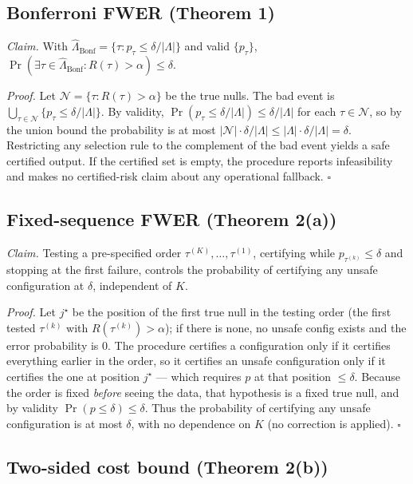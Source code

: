 \documentclass{ieeeaccess}
\begin{document}
\subsection{Bonferroni FWER (Theorem 1)}

\emph{Claim.} With $\hat\Lambda_{\mathrm{Bonf}}=\{\tau:p_\tau\le\delta/|\Lambda|\}$ and valid $\{p_\tau\}$, $\Pr(\exists\tau\in\hat\Lambda_{\mathrm{Bonf}}:R(\tau)>\alpha)\le\delta$.

\emph{Proof.} Let $\mathcal N=\{\tau:R(\tau)>\alpha\}$ be the true nulls. The bad event is $\bigcup_{\tau\in\mathcal N}\{p_\tau\le\delta/|\Lambda|\}$. By validity, $\Pr(p_\tau\le\delta/|\Lambda|)\le\delta/|\Lambda|$ for each $\tau\in\mathcal N$, so by the union bound the probability is at most $|\mathcal N|\cdot\delta/|\Lambda|\le|\Lambda|\cdot\delta/|\Lambda|=\delta$. Restricting any selection rule to the complement of the bad event yields a safe certified output. If the certified set is empty, the procedure reports infeasibility and makes no certified-risk claim about any operational fallback. $\square$

\subsection{Fixed-sequence FWER (Theorem 2(a))}

\emph{Claim.} Testing a pre-specified order $\tau^{(K)},\dots,\tau^{(1)}$, certifying while $p_{\tau^{(k)}}\le\delta$ and stopping at the first failure, controls the probability of certifying any unsafe configuration at $\delta$, independent of $K$.

\emph{Proof.} Let $j^\star$ be the position of the first true null in the testing order (the first tested $\tau^{(k)}$ with $R(\tau^{(k)})>\alpha$); if there is none, no unsafe config exists and the error probability is $0$. The procedure certifies a configuration only if it certifies everything earlier in the order, so it certifies an unsafe configuration only if it certifies the one at position $j^\star$ --- which requires $p$ at that position $\le\delta$. Because the order is fixed \emph{before} seeing the data, that hypothesis is a fixed true null, and by validity $\Pr(p\le\delta)\le\delta$. Thus the probability of certifying any unsafe configuration is at most $\delta$, with no dependence on $K$ (no correction is applied). $\square$

\subsection{Two-sided cost bound (Theorem 2(b))}
\end{document}
